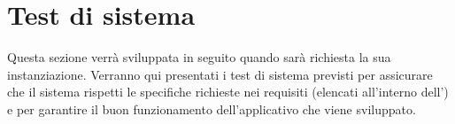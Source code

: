 \documentclass[PianoDiQualifica.tex]{subfiles}
\begin{document}
\chapter{Test di sistema}
Questa sezione verrà sviluppata in seguito quando sarà richiesta la sua instanziazione.
Verranno qui presentati i test di sistema previsti per assicurare che il sistema rispetti le specifiche richieste nei requisiti (elencati all'interno dell'\adr) e per garantire il buon funzionamento dell'applicativo che viene sviluppato.
\end{document}
